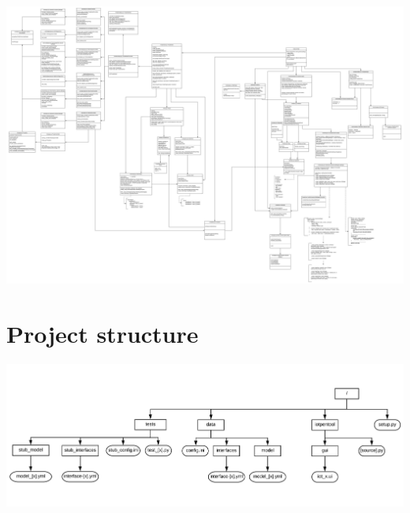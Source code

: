 \documentclass{article}
\begin{document}
\begin{center}
	\begin{sideways}%
		\begin{minipage}{0.92\textheight}
			\includegraphics[width=\linewidth,keepaspectratio]{overall_class_diagram}
			\label{fig:xx}
		\end{minipage}
	\end{sideways}
\end{center}


\section{Project structure}\label{sec:appendix-proj-struct}

\begin{center}
	\begin{sideways}%
		\begin{minipage}{0.92\textheight}
			\includegraphics[width=\linewidth,keepaspectratio]{project_layout}
			\label{fig:xx}
		\end{minipage}
	\end{sideways}
\end{center}
\end{document}
